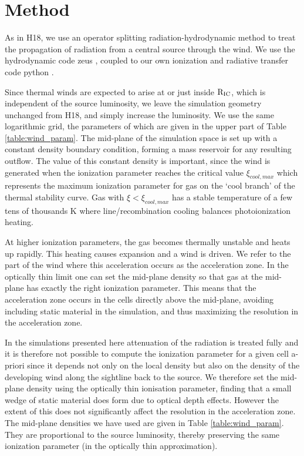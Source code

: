 \documentclass[a4paper,fleqn,usenatbib]{mnras}
\begin{document}
 

\section{Method }
\label{section:method}

As in H18, we use an operator splitting radiation-hydrodynamic method to treat the propagation of radiation
from a central source through the wind. We use the hydrodynamic code {\sc zeus} 
\citep[][extended by \citealt{2000ApJ...543..686P}]{1992ApJS...80..753S}, coupled to our own ionization and
 radiative transfer code {\sc python} \citep[][extended by \citealt{,2013MNRAS.436.1390H} and 
 \citealt{2015MNRAS.450.3331M}]{2002ApJ...579..725L}. 

Since thermal winds are expected to arise at or just inside $\rm{R_{IC}}$, which is independent of the source 
luminosity, we leave the simulation geometry unchanged
from H18, and simply increase the luminosity. We use the same logarithmic grid, the parameters of which are given in the upper
part of Table \ref{table:wind_param}. The mid-plane of the simulation space is set up with a constant 
density boundary condition, forming a mass reservoir for any resulting outflow. The value of this constant density
is important, since the wind is generated when the ionization parameter reaches the critical value $\xi_{cool,max}$ which
represents the maximum ionization parameter for gas on the `cool branch' of the thermal stability curve. Gas with
$\xi<\xi_{cool,max}$ has a stable temperature of a few tens of thousands K where line/recombination cooling 
balances photoionization heating. 

At higher ionization parameters, the gas becomes thermally unstable and heats up rapidly. 
This heating causes expansion and
a wind is driven. We refer to the part of the wind where this acceleration occurs as the acceleration zone.
In the optically thin limit one can set the mid-plane density so that gas at the mid-plane has
exactly the right ionization parameter. This means that the acceleration zone occurs in the cells directly 
above the mid-plane, avoiding including static material in the simulation, and thus maximizing the resolution in the acceleration zone.

In the simulations presented here attenuation of the radiation is treated fully and it is therefore not possible to 
compute the ionization parameter for a given cell a-priori since it depends not only on the local density  
but also on the density of the developing wind along the 
sightline back to the source. 
We therefore set the mid-plane density using the optically thin ionisation parameter,
finding that a small wedge of static material does form due to optical depth effects. However the extent of this does not significantly
affect the resolution in the acceleration zone. The mid-plane densities we have used are given in Table 
\ref{table:wind_param}. They are proportional to the source luminosity,  thereby preserving the same
ionization parameter (in the optically thin approximation).
\end{document}

